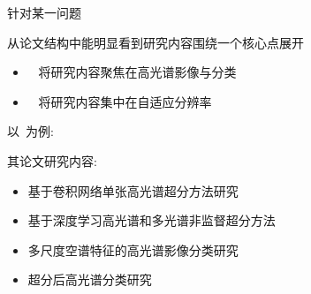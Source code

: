 \begin{frame}{针对某一问题}

    从论文结构中能明显看到研究内容围绕一个核心点展开
    \begin{itemize}
        \item ~\cite{zhengk} 将研究内容聚焦在高光谱影像与分类
        \item ~\cite{huxc} 将研究内容集中在自适应分辨率
    \end{itemize}
    以~\cite{zhengk}为例:
    
    其论文研究内容:
    \begin{itemize}
        \item 基于卷积网络单张高光谱超分方法研究
        \item 基于深度学习高光谱和多光谱非监督超分方法
        \item 多尺度空谱特征的高光谱影像分类研究
        \item 超分后高光谱分类研究
    \end{itemize}
\end{frame}






